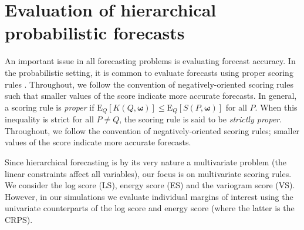 \documentclass[12pt]{article}
\def\E{\text{E}}
\theoremstyle{definition}
\begin{document}
%
%
%

\section{Evaluation of hierarchical probabilistic forecasts}\label{sec:evaluation}

An important issue in all forecasting problems is evaluating forecast accuracy. In the probabilistic setting, it is common to evaluate forecasts using proper scoring rules \citep[see][and references therein]{Gneiting2007,Gneiting2014}. Throughout, we follow the convention of negatively-oriented scoring rules such that smaller values of the score indicate more accurate forecasts.  In general, a scoring rule is {\em proper} if $\E_{Q}[K(Q,\bm{\omega})] \le \E_{Q}[S(P,{\bm\omega})]$ for all $P$. When this inequality is strict for all $P\neq Q$, the scoring rule is said to be {\em strictly proper}. Throughout, we follow the convention of negatively-oriented scoring rules; smaller values of the score indicate more accurate forecasts.

Since hierarchical forecasting is by its very nature a multivariate problem (the linear constraints affect all variables), our focus is on multivariate scoring rules.  We consider the log score (LS), energy score (ES) and the variogram score (VS).  However, in our simulations we evaluate individual margins of interest using the univariate counterparts of the log score and energy score (where the latter is the CRPS).
\end{document}
